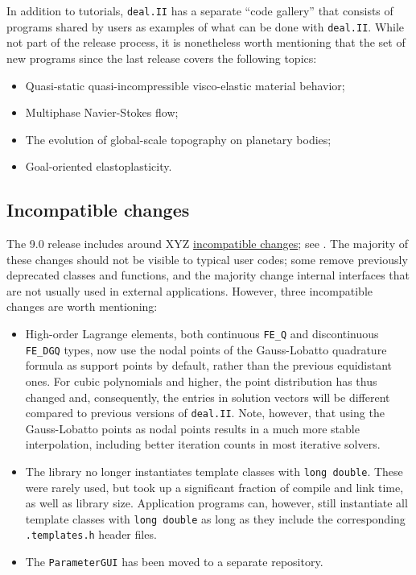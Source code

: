 \documentclass{ansarticle-preprint}
\newcommand{\specialword}[1]{\texttt{#1}}
\newcommand{\dealii}{{\specialword{deal.II}}}
\begin{document}
In addition to tutorials, \dealii{} has a separate ``code gallery'' that
consists of programs shared by users as examples of what can be
done with \dealii{}. While not part of the release process, it is nonetheless
worth mentioning that the set of new programs since the last release covers
the following topics:
  \begin{itemize}
    \item Quasi-static quasi-incompressible visco-elastic material behavior;
    \item Multiphase Navier-Stokes flow;
    \item The evolution of global-scale topography on planetary bodies;
    \item Goal-oriented elastoplasticity.
  \end{itemize}


\subsection{Incompatible changes}

The 9.0 release includes around XYZ
\href{https://www.dealii.org/developer/doxygen/deal.II/changes_between_8_5_and_9_0.html}{
incompatible changes}; see \cite{changes90}. The majority of these changes
should not be visible to typical user codes; some remove previously
deprecated classes and functions, and the majority change internal
interfaces that are not usually used in external applications. However, three
incompatible changes are worth mentioning:
\begin{itemize}
  \item High-order Lagrange elements, both continuous \verb!FE_Q! and
    discontinuous \verb!FE_DGQ! types, now use the nodal points of the
    Gauss-Lobatto quadrature formula as support points by default, rather than the
    previous equidistant ones. For cubic polynomials and higher, the point
    distribution has thus changed and, consequently, the entries in
    solution vectors will be different compared to previous
    versions of \dealii{}. Note, however, that using the Gauss-Lobatto points as nodal
    points results in a much more stable interpolation, including better
    iteration counts in most iterative solvers.
  \item
    The library no longer instantiates template classes with \texttt{long
    double}. These were rarely used, but took up a significant
    fraction of compile and link time, as well as library
    size. Application programs can, however, still instantiate all
    template classes with \texttt{long
    double} as long as they include the corresponding \texttt{.templates.h}
    header files.
  \item
    The \texttt{ParameterGUI} has been moved to a separate repository.
\end{itemize}
\end{document}
